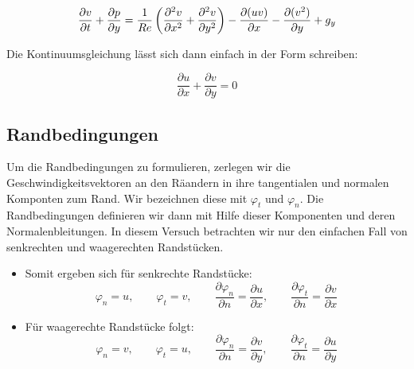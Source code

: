		\[ \frac{\partial v}{\partial t} + \frac{\partial p}{\partial y} = \frac{1}{Re} \left(  \frac{\partial ^{2} v}{\partial x ^{2}} + \frac{\partial ^{2} v}{\partial y ^{2}} \right) 
		- \frac{ \partial (uv) }{ \partial x} - \frac{ \partial (v^{2}) }{ \partial y} + g_y\]

		Die Kontinuumsgleichung lässt sich dann einfach in der Form schreiben:

		\[ \frac{\partial u}{\partial x} + \frac{\partial v}{\partial y} = 0\]




	

	\subsection{Randbedingungen} %
	\label{sub:randbedingungen}
	
		Um die Randbedingungen zu formulieren, zerlegen wir die Geschwindigkeitsvektoren an den Räandern in ihre tangentialen und normalen Komponten zum Rand.
		Wir bezeichnen diese mit $\varphi _t$ und $\varphi _n$.
		Die Randbedingungen definieren wir dann mit Hilfe dieser Komponenten und deren Normalenbleitungen.
		In diesem Versuch betrachten wir nur den einfachen Fall von senkrechten und waagerechten Randstücken.

		\begin{itemize}
			\item 
			Somit ergeben sich für senkrechte Randstücke:
			\[ \varphi _n = u, \qquad \varphi_t = v, \qquad  \frac{\partial \varphi_n}{\partial n} = \frac{\partial u}{\partial x}, 
			\qquad \frac{\partial \varphi_t}{\partial n} = \frac{\partial v}{\partial x}\]

			\item
			Für waagerechte Randstücke folgt:
			\[ \varphi _n = v, \qquad \varphi_t = u, \qquad  \frac{\partial \varphi_n}{\partial n} = \frac{\partial v}{\partial y}, 
			\qquad \frac{\partial \varphi_t}{\partial n} = \frac{\partial u}{\partial y}\]

		\end{itemize}

